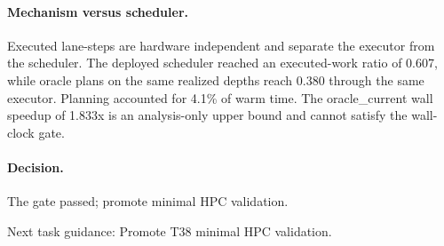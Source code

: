 \paragraph{Mechanism versus scheduler.}
Executed lane-steps are hardware independent and separate the executor from the scheduler. The deployed scheduler reached an executed-work ratio of 0.607, while oracle plans on the same realized depths reach 0.380 through the same executor.
Planning accounted for 4.1\% of warm time.
The oracle\_current wall speedup of 1.833x is an analysis-only upper bound and cannot satisfy the wall-clock gate.

\paragraph{Decision.}
The gate passed; promote minimal HPC validation.

Next task guidance: Promote T38 minimal HPC validation.
